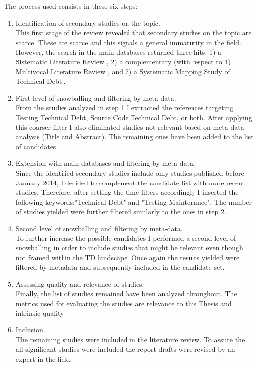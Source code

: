 The process used consists in these six steps:
\begin{enumerate}
    \item Identification of secondary studies on the topic.\\
        This first stage of the review revealed that secondary studies on the topic are scarce. These are scarce and this signals a general immaturity in the field. However, the search in the main databases returned three hits: 1) a Sistematic Literature Review \cite{exploration_of_td}, 2) a complementary (with respect to 1) Multivocal Literature Review \cite{exploration_of_td2}, and 3) a Systematic Mapping Study of Technical Debt \cite{mapping_study_td}.
        
        
    \item First level of snowballing and filtering by meta-data.\\
        From the studies analyzed in step 1 I extracted the references targeting Testing Technical Debt, Source Code Technical Debt, or both. After applying this coarser filter I also eliminated studies not relevant based on meta-data analysis (Title and Abstract). The remaining ones have been added to the list of candidates. 
        
    \item Extension with main databases and filtering by meta-data.\\
    Since the identified secondary studies include only studies published before January 2014, I decided to complement the candidate list with more recent studies. Therefore, after setting the time filters accordingly I inserted the following keywords:"Technical Debt" and "Testing Maintenance". The number of studies yielded were further filtered similarly to the ones in step 2.
    
    
    \item Second level of snowballing and filtering by meta-data.\\
        To further increase the possible candidates I performed a second level of snowballing in order to include studies that might be relevant even though not framed within the TD landscape. Once again the results yielded were filtered by metadata and subsequently included in the candidate set.
    
    
    \item Assessing quality and relevance of studies.\\
        Finally, the list of studies remained have been analyzed throughout. The metrics used for evaluating the studies are relevance to this Thesis and intrinsic quality.
    
    
    \item Inclusion.\\
        The remaining studies were included in the literature review. To assure the all significant studies were included the report drafts were revised by an expert in the field.
        
\end{enumerate}

